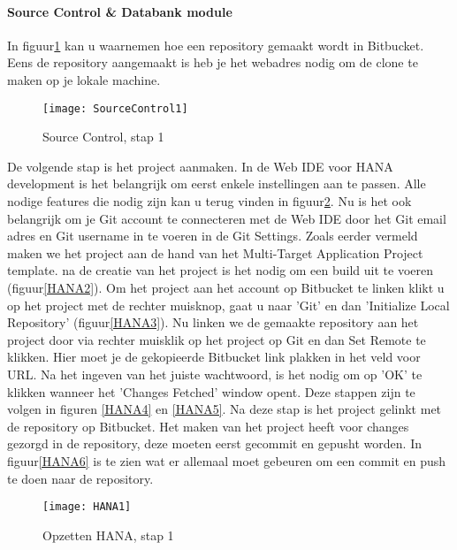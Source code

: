             \paragraph{Source Control \& Databank module}
            In figuur\ref{SourceControl1} kan u waarnemen hoe een repository gemaakt wordt in Bitbucket.
            Eens de repository aangemaakt is heb je het webadres nodig om de clone te maken op je lokale machine.
            
            \begin{figure}
                \centering
                \texttt{[image: SourceControl1]}
                \caption{Source Control, stap 1} \label{SourceControl1}
            \end{figure}
            
            De volgende stap is het project aanmaken. In de Web IDE voor HANA development is het belangrijk om eerst enkele instellingen aan te passen.
            Alle nodige features die nodig zijn kan u terug vinden in figuur\ref{HANA1}. Nu is het ook belangrijk om je Git account te connecteren met de Web IDE door het Git email adres en Git username in te voeren in de Git Settings.
            Zoals eerder vermeld maken we het project aan de hand van het Multi-Target Application Project template. na de creatie van het project is het nodig om een build uit te voeren (figuur\ref{HANA2}).
            Om het project aan het account op Bitbucket te linken klikt u op het project met de rechter muisknop, gaat u naar 'Git' en dan 'Initialize Local Repository' (figuur\ref{HANA3}).
            Nu linken we de gemaakte repository aan het project door via rechter muisklik op het project op Git en dan Set Remote te klikken. Hier moet je de gekopieerde Bitbucket link plakken in het veld voor URL. Na het ingeven van het juiste wachtwoord, is het nodig om op 'OK' te klikken wanneer het 'Changes Fetched' window opent. Deze stappen zijn te volgen in figuren \ref{HANA4} en \ref{HANA5}.
            Na deze stap is het project gelinkt met de repository op Bitbucket. Het maken van het project heeft voor changes gezorgd in de repository, deze moeten eerst gecommit en gepusht worden. In figuur\ref{HANA6} is te zien wat er allemaal moet gebeuren om een commit en push te doen naar de repository.
    
            \begin{figure}
                \centering
                \texttt{[image: HANA1]}
                \caption{Opzetten HANA, stap 1} \label{HANA1}
            \end{figure}
        
